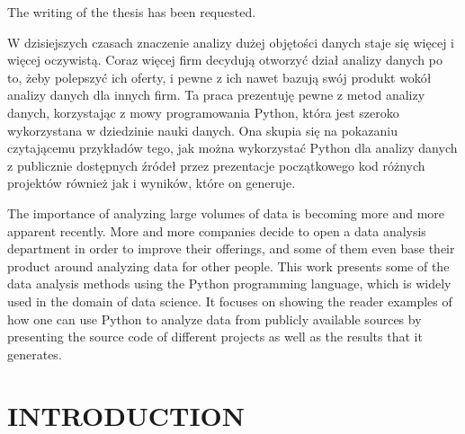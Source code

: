 \documentclass[12pt, a4paper]{article}
\newenvironment{abstractpage}
  {\cleardoublepage\vspace*{\fill}\thispagestyle{empty}}
  {\vfill\cleardoublepage}
\renewenvironment{abstract}[1]
  {\bigskip\selectlanguage{#1}%
   \begin{center}\bfseries\abstractname\end{center}}
  {\par\bigskip}
\begin{document}


\vspace*{\fill}
\begin{center}
The writing of the thesis has been requested.
\end{center}
\vspace{\fill}
\newpage

\tableofcontents
\newpage

\newpage

\begin{abstractpage}
  \begin{abstract}{polish}
      W dzisiejszych czasach znaczenie analizy dużej objętości danych staje się więcej i więcej oczywistą. Coraz więcej firm decydują otworzyć dział analizy danych po to, żeby polepszyć ich oferty, i pewne z ich nawet bazują swój produkt wokół analizy danych dla innych firm. Ta praca prezentuję pewne z metod analizy danych, korzystając z mowy programowania Python, która jest szeroko wykorzystana w dziedzinie nauki danych. Ona skupia się na pokazaniu czytającemu przykładów tego, jak można wykorzystać Python dla  analizy danych z publicznie dostępnych źródeł przez prezentacje początkowego kod różnych projektów również jak i wyników, które on generuje.
  \end{abstract}

  \begin{abstract}{british}
    The importance of analyzing large volumes of data is becoming more and more apparent recently. More and more companies decide to open a data analysis department in order to improve their offerings, and some of them even base their product around analyzing data for other people. This work presents some of the data analysis methods using the Python programming language, which is widely used in the domain of data science. It focuses on showing the reader examples of how one can use Python to analyze data from publicly available sources by presenting the source code of different projects as well as the results that it generates.
  \end{abstract}

\end{abstractpage}




\newpage
\section{INTRODUCTION}
\end{document}
